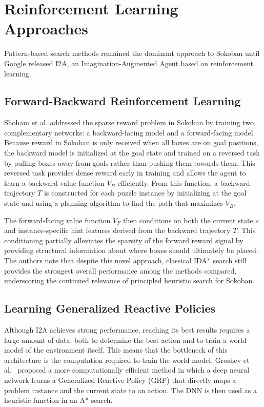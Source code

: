 

\section{Reinforcement Learning Approaches}

Pattern-based search methods remained the dominant approach to Sokoban until Google released I2A, an Imagination-Augmented Agent based on reinforcement learning.



\subsection{Forward-Backward Reinforcement Learning}

Shoham et al. \cite{shoham2021solving} addressed the sparse reward problem in Sokoban by training two complementary networks: a backward-facing model and a forward-facing model. Because reward in Sokoban is only received when all boxes are on goal positions, the backward model is initialized at the goal state and trained on a reversed task by pulling boxes away from goals rather than pushing them towards them. This reversed task provides dense reward early in training and allows the agent to learn a backward value function $V_B$ efficiently. From this function, a backward trajectory $T$ is constructed for each puzzle instance by initializing at the goal state and using a planning algorithm to find the path that maximizes $V_B$.

The forward-facing value function $V_F$ then conditions on both the current state $s$ and instance-specific hint features derived from the backward trajectory $T$. This conditioning partially alleviates the sparsity of the forward reward signal by providing structural information about where boxes should ultimately be placed. The authors note that despite this novel approach, classical IDA* search still provides the strongest overall performance among the methods compared, underscoring the continued relevance of principled heuristic search for Sokoban.


\subsection{Learning Generalized Reactive Policies}

Although I2A achieves strong performance, reaching its best results requires a large amount of data: both to determine the best action and to train a world model of the environment itself. This means that the bottleneck of this architecture is the computation required to train the world model. Groshev et al.\ \cite{groshev2018learning} proposed a more computationally efficient method in which a deep neural network learns a Generalized Reactive Policy (GRP) that directly maps a problem instance and the current state to an action. The DNN is then used as a heuristic function in an A* search.

